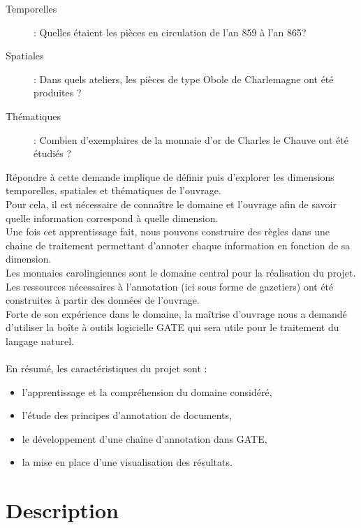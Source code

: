 \documentclass[a4paper, 11pt]{report}
\begin{document}
\begin{description}
\item [Temporelles] : Quelles étaient les pièces en circulation de l'an 859 à l'an 865?
\item [Spatiales] : Dans quels ateliers, les pièces de type Obole de Charlemagne ont été produites ? 
\item [Thématiques] : Combien d'exemplaires de la monnaie d'or de Charles le Chauve ont été étudiés ?
\end{description}

Répondre à cette demande implique de définir puis d'explorer les dimensions temporelles, spatiales et thématiques de l'ouvrage.\\
Pour cela, il est nécessaire de connaître le domaine et l'ouvrage afin de savoir quelle information correspond à quelle dimension.\\
Une fois cet apprentissage fait, nous pouvons construire des règles dans une chaine de traitement permettant d'annoter chaque information en fonction de sa dimension. \\

Les monnaies carolingiennes sont le domaine central pour la réalisation du projet. Les ressources nécessaires à l'annotation (ici sous forme de gazetiers) ont été construites à partir des données de l'ouvrage.\\

Forte de son expérience dans le domaine, la maîtrise d'ouvrage nous a demandé d'utiliser la boîte à outils logicielle GATE qui sera utile pour le traitement du langage naturel.\\~\\

En résumé, les caractéristiques du projet sont : 
\begin{itemize}
\item l'apprentissage et la compréhension du domaine considéré,
\item l'étude des principes d'annotation de documents,
\item le développement d'une chaîne d'annotation dans GATE,
\item la mise en place d'une visualisation des résultats.
\end{itemize}

\newpage
	\section{Description}
	
\end{document}
